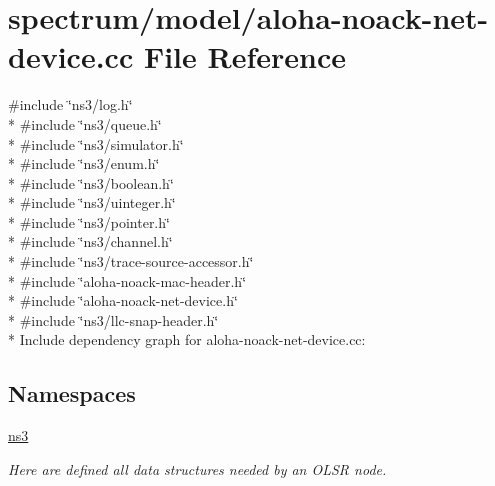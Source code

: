 \hypertarget{aloha-noack-net-device_8cc}{}\section{spectrum/model/aloha-\/noack-\/net-\/device.cc File Reference}
\label{aloha-noack-net-device_8cc}
{\ttfamily \#include \char`\"{}ns3/log.\+h\char`\"{}}\\*
{\ttfamily \#include \char`\"{}ns3/queue.\+h\char`\"{}}\\*
{\ttfamily \#include \char`\"{}ns3/simulator.\+h\char`\"{}}\\*
{\ttfamily \#include \char`\"{}ns3/enum.\+h\char`\"{}}\\*
{\ttfamily \#include \char`\"{}ns3/boolean.\+h\char`\"{}}\\*
{\ttfamily \#include \char`\"{}ns3/uinteger.\+h\char`\"{}}\\*
{\ttfamily \#include \char`\"{}ns3/pointer.\+h\char`\"{}}\\*
{\ttfamily \#include \char`\"{}ns3/channel.\+h\char`\"{}}\\*
{\ttfamily \#include \char`\"{}ns3/trace-\/source-\/accessor.\+h\char`\"{}}\\*
{\ttfamily \#include \char`\"{}aloha-\/noack-\/mac-\/header.\+h\char`\"{}}\\*
{\ttfamily \#include \char`\"{}aloha-\/noack-\/net-\/device.\+h\char`\"{}}\\*
{\ttfamily \#include \char`\"{}ns3/llc-\/snap-\/header.\+h\char`\"{}}\\*
Include dependency graph for aloha-\/noack-\/net-\/device.cc\+:
\subsection*{Namespaces}
\begin{DoxyCompactItemize}
\item 
 \hyperlink{namespacens3}{ns3}
\begin{DoxyCompactList}\small\item\em Here are defined all data structures needed by an O\+L\+SR node. \end{DoxyCompactList}\end{DoxyCompactItemize}

